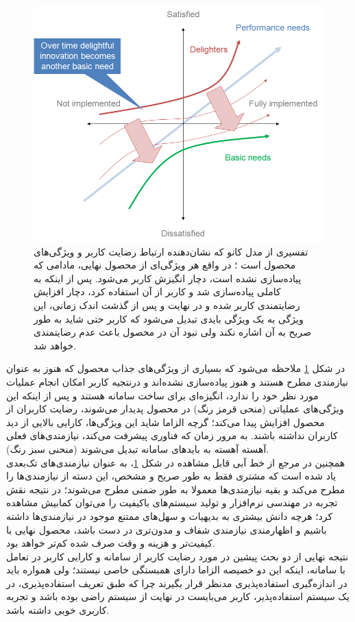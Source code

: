 \begin{figure}[H]
	\centering\includegraphics[width=13cm]{Resources/kano_model.PNG}
	\caption[تفسیری از مدل کانو]
	{تفسیری از مدل کانو که نشان‌دهنده ارتباط رضایت کاربر و ویژگی‌های محصول است
		\cite{noauthor_kano_2018}؛
		در واقع هر ویژگی‌ای از محصول نهایی، مادامی که پیاده‌سازی نشده است، دچار انگیزش کاربر می‌شود. پس از اینکه به کاملی پیاده‌سازی شد و کاربر از آن استفاده کرد، دچار افزایش رضایتمندی کاربر شده و در نهایت و پس از گذشت اندک زمانی، این ویژگی به یک ویژگی بایدی تبدیل می‌شود که کاربر حتی شاید به طور صریح به آن اشاره نکند ولی نبود آن در محصول باعث عدم رضایتمندی خواهد شد.
	}
	\label{fig:kano}
\end{figure}
در شکل
\ref{fig:kano}
ملاحظه می‌شود که بسیاری از ویژگی‌های جذاب محصول که هنوز به عنوان نیازمندی مطرح هستند و هنوز پیاده‌سازی نشده‌اند و درنتجیه کاربر امکان انجام عملیات مورد نظر خود را ندارد، انگیزه‌ای برای ساخت سامانه هستند و پس از اینکه این ویژگی‌های عملیاتی (منحی قرمز رنگ) در محصول پدیدار می‌شوند، رضایت کاربران از محصول افزایش پیدا می‌کند؛ گرچه الزاما شاید این ویژگی‌ها، کارایی بالایی از دید کاربران نداشته باشند. به مرور زمان که فناوری پیشرفت می‌کند، نیازمندی‌های فعلی آهسته آهسته به باید‌های سامانه تبدیل می‌شوند (منحنی سبز رنگ).\\
همچنین در مرجع
\cite{sauerwein_kano_1996}
از خط آبی قابل مشاهده در شکل
\ref{fig:kano}،
به عنوان نیازمندی‌های تک‌بعدی یاد شده است که مشتری فقط به طور صریح و مشخص، این دسته از نیازمندی‌ها را مطرح می‌کند و بقیه نیازمندی‌ها معمولا به طور ضمنی مطرح می‌شوند؛ در نتیجه نقش تجربه در مهندسی نرم‌افزار و تولید سیستم‌های باکیفیت را می‌توان کمابیش مشاهده کرد؛ هرچه دانش بیشتری به بدیهیات و سهل‌های ممتنع موجود در نیازمندی‌ها داشته باشیم و اظهارمندی نیازمندی شفاف و مدون‌تری در دست باشد، محصول نهایی با کیفیت‌تر و هزینه و وقت صرف شده کم‌تر خواهد بود.\\
نتیجه نهایی از دو بحث پیشین در مورد رضایت کاربر از سامانه و کارایی کاربر در تعامل با سامانه، اینکه این دو خصیصه الزاما دارای همبستگی خاصی نیستند؛ ولی همواره باید در اندازه‌گیری استفاده‌پذیری مدنظر قرار بگیرند چرا که طبق تعریف استفاده‌پذیری، در یک سیستم استفاده‌پذیر، کاربر می‌بایست در نهایت از سیستم راضی بوده باشد و تجربه کاربری خوبی داشته باشد.
